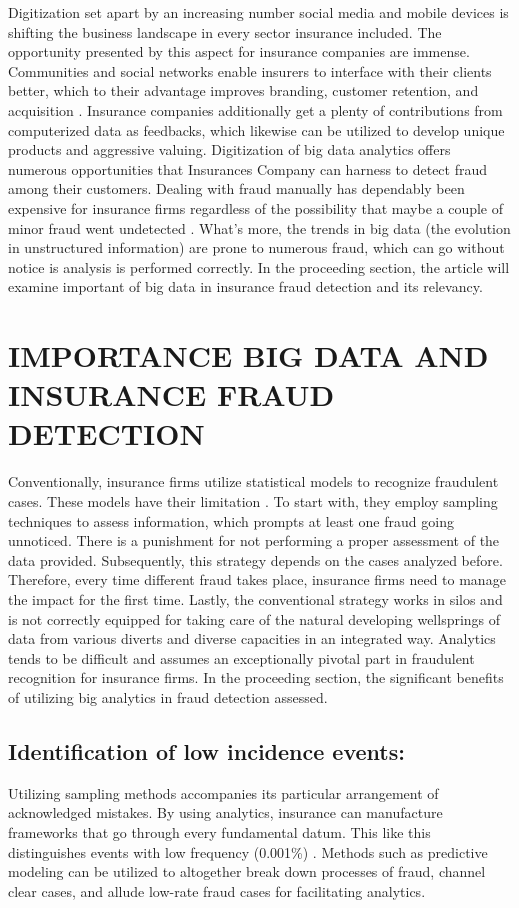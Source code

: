 \documentclass[sigconf]{acmart}
\begin{document}
 Digitization set apart by an increasing number social media and mobile devices is shifting the business landscape in every sector insurance included. The opportunity presented by this aspect for insurance companies are immense. Communities and social networks enable insurers to interface with their clients better, which to their advantage improves branding, customer retention, and acquisition \cite{12}. Insurance companies additionally get a plenty of contributions from computerized data as feedbacks, which likewise can be utilized to develop unique products and aggressive valuing. Digitization of big data analytics offers numerous opportunities that Insurances Company can harness to detect fraud among their customers. Dealing with fraud manually has dependably been expensive for insurance firms regardless of the possibility that maybe a couple of minor fraud went undetected \cite{16}. What's more, the trends in big data (the evolution in unstructured information) are prone to numerous fraud, which can go without notice is analysis is performed correctly. In the proceeding section, the article will examine important of big data in insurance fraud detection and its relevancy.  

\section{IMPORTANCE BIG DATA AND INSURANCE FRAUD DETECTION}
Conventionally, insurance firms utilize statistical models to recognize fraudulent cases. These models have their limitation \cite{18}. To start with, they employ sampling techniques to assess information, which prompts at least one fraud going unnoticed. There is a punishment for not performing a proper assessment of the data provided. Subsequently, this strategy depends on the cases analyzed before. Therefore, every time different fraud takes place, insurance firms need to manage the impact for the first time. Lastly, the conventional strategy works in silos and is not correctly equipped for taking care of the natural developing wellsprings of data from various diverts and diverse capacities in an integrated way. Analytics tends to be difficult and assumes an exceptionally pivotal part in fraudulent recognition for insurance firms. In the proceeding section, the significant benefits of utilizing big analytics in fraud detection assessed.

\subsection{Identification of low incidence events: }
Utilizing sampling methods accompanies its particular arrangement of acknowledged mistakes. By using analytics, insurance can manufacture frameworks that go through every fundamental datum. This like this distinguishes events with low frequency (0.001{\%}) \cite{17}. Methods such as predictive modeling can be utilized to altogether break down processes of fraud, channel clear cases, and allude low-rate fraud cases for facilitating analytics. 
\end{document}
